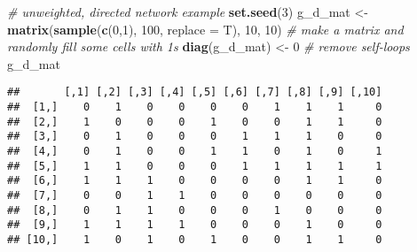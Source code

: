 \documentclass[]{article}
\newenvironment{Shaded}{\begin{snugshade}}{\end{snugshade}}
\newcommand{\KeywordTok}[1]{\textcolor[rgb]{0.13,0.29,0.53}{\textbf{#1}}}
\newcommand{\DataTypeTok}[1]{\textcolor[rgb]{0.13,0.29,0.53}{#1}}
\newcommand{\DecValTok}[1]{\textcolor[rgb]{0.00,0.00,0.81}{#1}}
\newcommand{\StringTok}[1]{\textcolor[rgb]{0.31,0.60,0.02}{#1}}
\newcommand{\CommentTok}[1]{\textcolor[rgb]{0.56,0.35,0.01}{\textit{#1}}}
\newcommand{\NormalTok}[1]{#1}
\begin{document}
\begin{Shaded}
\begin{Highlighting}[]
\CommentTok{# unweighted, directed network example}
\KeywordTok{set.seed}\NormalTok{(}\DecValTok{3}\NormalTok{)}
\NormalTok{g_d_mat <-}\StringTok{ }\KeywordTok{matrix}\NormalTok{(}\KeywordTok{sample}\NormalTok{(}\KeywordTok{c}\NormalTok{(}\DecValTok{0}\NormalTok{,}\DecValTok{1}\NormalTok{), }\DecValTok{100}\NormalTok{, }\DataTypeTok{replace =}\NormalTok{ T), }\DecValTok{10}\NormalTok{, }\DecValTok{10}\NormalTok{) }\CommentTok{# make a matrix and randomly fill some cells with 1s }
\KeywordTok{diag}\NormalTok{(g_d_mat) <-}\StringTok{ }\DecValTok{0} \CommentTok{# remove self-loops }
\NormalTok{g_d_mat}
\end{Highlighting}
\end{Shaded}

\begin{verbatim}
##       [,1] [,2] [,3] [,4] [,5] [,6] [,7] [,8] [,9] [,10]
##  [1,]    0    1    0    0    0    0    1    1    1     0
##  [2,]    1    0    0    0    1    0    0    1    1     0
##  [3,]    0    1    0    0    0    1    1    1    0     0
##  [4,]    0    1    0    0    1    1    0    1    0     1
##  [5,]    1    1    0    0    0    1    1    1    1     1
##  [6,]    1    1    1    0    0    0    0    1    1     0
##  [7,]    0    0    1    1    0    0    0    0    0     0
##  [8,]    0    1    1    0    0    0    1    0    0     0
##  [9,]    1    1    1    1    0    0    0    1    0     0
## [10,]    1    0    1    0    1    0    0    1    1     0
\end{verbatim}
\end{document}
